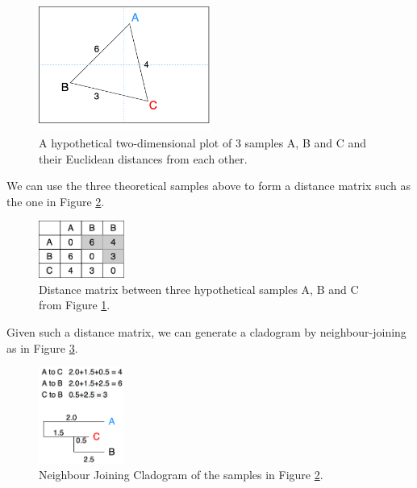 \documentclass[10pt, a4paper]{article}
\begin{document}
\begin{figure}
\centering
\includegraphics[width=0.5\textwidth]{../Figures/Methods/Cartesian_Plot.png}
\caption[Cartesian Plot]{\label{fig:org1bd1e2b}A hypothetical two-dimensional plot of 3 samples A, B and C and their Euclidean distances from each other.}
\end{figure}

We can use the three theoretical samples above to form a distance matrix such
as the one in Figure \ref{fig:orgfac9d13}.

\begin{figure}
\centering
\includegraphics[width=0.25\textwidth]{../Figures/Methods/Distance_Matrix.png}
\caption[Distance Matrix]{\label{fig:orgfac9d13}Distance matrix between three hypothetical samples A, B and C from Figure \ref{fig:org1bd1e2b}.}
\end{figure}

Given such a distance matrix, we can generate a cladogram by neighbour-joining
as in Figure \ref{fig:orgea0897c}.

\begin{figure}
\centering
\includegraphics[width=0.25\textwidth]{../Figures/Methods/Neighbour_Joining_Cladogram.png}
\caption[Neighbour-joining Cladogram]{\label{fig:orgea0897c}Neighbour Joining Cladogram of the samples in Figure \ref{fig:orgfac9d13}.}
\end{figure}
\end{document}
